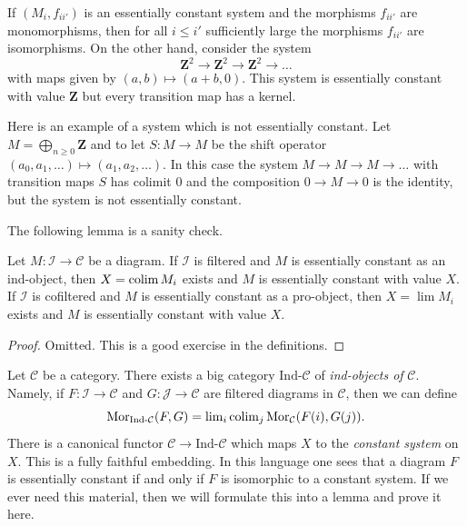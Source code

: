 \noindent
If $(M_i, f_{ii'})$ is an essentially constant system and the morphisms
$f_{ii'}$ are monomorphisms, then for all $i \leq i'$ sufficiently large the
morphisms $f_{ii'}$ are isomorphisms. On the other hand, consider the system
$$
\mathbf{Z}^2 \to \mathbf{Z}^2 \to \mathbf{Z}^2 \to \ldots
$$
with maps given by $(a, b) \mapsto (a + b, 0)$. This system is essentially
constant with value $\mathbf{Z}$ but every transition map has a kernel.

\medskip\noindent
Here is an example of a system which is not essentially constant. Let
$M = \bigoplus_{n \geq 0} \mathbf{Z}$ and to let $S : M \to M$ be the
shift operator $(a_0, a_1, \ldots) \mapsto (a_1, a_2, \ldots)$. In this
case the system $M \to M \to M \to \ldots$ with transition maps $S$
has colimit $0$ and the composition $0 \to M \to 0$ is the identity,
but the system is not essentially constant.

\medskip\noindent
The following lemma is a sanity check.

\begin{lemma}
\label{lemma-essentially-constant-is-limit-colimit}
Let $M : \mathcal{I} \to \mathcal{C}$ be a diagram.
If $\mathcal{I}$ is filtered and $M$ is essentially
constant as an ind-object, then $X = \mathop{\mathrm{colim}}\nolimits M_i$ exists and $M$
is essentially constant with value $X$.
If $\mathcal{I}$ is cofiltered and $M$ is essentially
constant as a pro-object, then $X = \lim M_i$ exists and $M$ is
essentially constant with value $X$.
\end{lemma}

\begin{proof}
Omitted. This is a good exercise in the definitions.
\end{proof}

\begin{remark}
\label{remark-ind-category}
Let $\mathcal{C}$ be a category. There exists a big category
$\text{Ind-}\mathcal{C}$ of {\it ind-objects of} $\mathcal{C}$.
Namely, if $F : \mathcal{I} \to \mathcal{C}$ and
$G : \mathcal{J} \to \mathcal{C}$ are filtered diagrams in $\mathcal{C}$,
then we can define
$$
\mathop{\mathrm{Mor}}\nolimits_{\text{Ind-}\mathcal{C}}(F, G) =
\mathop{\mathrm{lim}}\nolimits_i \mathop{\mathrm{colim}}\nolimits_j \mathop{\mathrm{Mor}}\nolimits_\mathcal{C}(F(i), G(j)).
$$
There is a canonical functor $\mathcal{C} \to \text{Ind-}\mathcal{C}$
which maps $X$ to the {\it constant system} on $X$. This is a fully
faithful embedding. In this language one sees that a diagram $F$ is
essentially constant if and only if $F$ is isomorphic to a constant system.
If we ever need this material, then we will formulate this into a lemma
and prove it here.
\end{remark}


